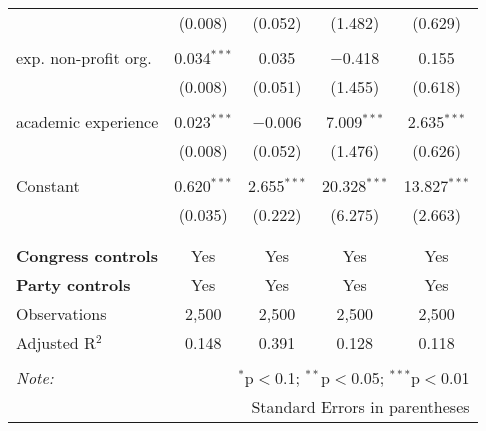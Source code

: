 \documentclass{article}
\begin{document}
\begin{table}[!htbp]
\begin{tabular}{@{\extracolsep{5pt}}lcccc}
  & (0.008) & (0.052) & (1.482) & (0.629) \\ 
  & & & & \\ 
 exp. non-profit org. & 0.034$^{***}$ & 0.035 & $-$0.418 & 0.155 \\ 
  & (0.008) & (0.051) & (1.455) & (0.618) \\ 
  & & & & \\ 
 academic experience & 0.023$^{***}$ & $-$0.006 & 7.009$^{***}$ & 2.635$^{***}$ \\ 
  & (0.008) & (0.052) & (1.476) & (0.626) \\ 
  & & & & \\ 
 Constant & 0.620$^{***}$ & 2.655$^{***}$ & 20.328$^{***}$ & 13.827$^{***}$ \\ 
  & (0.035) & (0.222) & (6.275) & (2.663) \\ 
  & & & & \\ 
\hline \\[-1.8ex] 
\textbf{Congress controls} & Yes & Yes & Yes & Yes \\ 
\textbf{Party controls} & Yes & Yes & Yes & Yes \\ 
Observations & 2,500 & 2,500 & 2,500 & 2,500 \\ 
Adjusted R$^{2}$ & 0.148 & 0.391 & 0.128 & 0.118 \\ 
\hline 
\hline \\[-1.8ex] 
\textit{Note:}  & \multicolumn{4}{r}{$^{*}$p$<$0.1; $^{**}$p$<$0.05; $^{***}$p$<$0.01} \\ 
 & \multicolumn{4}{r}{Standard Errors in parentheses} \\ 
\end{tabular} 
\end{table} 
\end{document}

